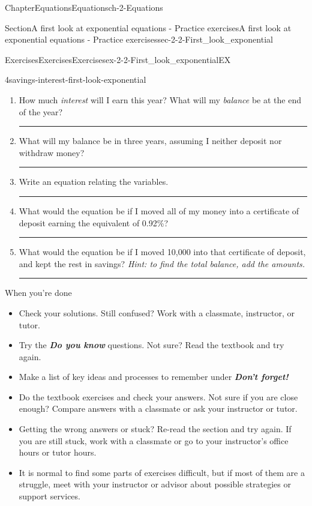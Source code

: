\documentclass[twoside,11pt,]{book}
\newcommand{\alert}[1]{\textbf{\textit{#1}}}
\newlength{\workspacestrutwidth}
\numberwithin{equation}{section}
\begin{document}
\begin{chapterptx}{Chapter}{Equations}{}{Equations}{}{}{ch-2-Equations}
\begin{sectionptx}{Section}{A first look at exponential equations - Practice exercises}{}{A first look at exponential equations - Practice exercises}{}{}{sec-2-2-First_look_exponential}
\begin{exercises-subsection-numberless}{Exercises}{Exercises}{}{Exercises}{}{}{ex-2-2-First_look_exponentialEX}
\begin{divisionexercise}{4}{}{}{savings-interest-first-look-exponential}
\begin{enumerate}[label=(\alph*),ref=\alph*]
%
\item{}How much \emph{interest} will I earn this year? What will my \emph{balance} be at the end of the year?%
\par\rule{\workspacestrutwidth}{0.75in}%
\item{}What will my balance be in three years, assuming I neither deposit nor withdraw money?%
\par\rule{\workspacestrutwidth}{0.75in}%
\item{}Write an equation relating the variables.%
\par\rule{\workspacestrutwidth}{0.75in}%
\item{}What would the equation be if I moved all of my money into a certificate of deposit earning the equivalent of 0.92\%?%
\par\rule{\workspacestrutwidth}{0.75in}%
\item{}What would the equation be if I moved \textdollar{}10,000 into that certificate of deposit, and kept the rest in savings? \emph{Hint: to find the total balance, add the amounts.}%
\par\rule{\workspacestrutwidth}{0.75in}%
\end{enumerate}%
\end{divisionexercise}%
\end{exercises-subsection-numberless}
\begin{conclusion}{When you're done \textellipsis{}}%
%
\begin{itemize}[label=\textbullet]
\item{}Check your solutions. Still confused? Work with a classmate, instructor, or tutor.%
\item{}Try the \alert{Do you know} questions. Not sure? Read the textbook and try again.%
\item{}Make a list of key ideas and processes to remember under \alert{Don't forget!}%
\item{}Do the textbook exercises and check your answers. Not sure if you are close enough? Compare answers with a classmate or ask your instructor or tutor.%
\item{}Getting the wrong answers or stuck? Re-read the section and try again. If you are still stuck, work with a classmate or go to your instructor's office hours or tutor hours.%
\item{}It is normal to find some parts of exercises difficult, but if most of them are a struggle, meet with your instructor or advisor about possible strategies or support services.%
\end{itemize}

\end{conclusion}
\end{sectionptx}
\end{chapterptx}
\end{document}
